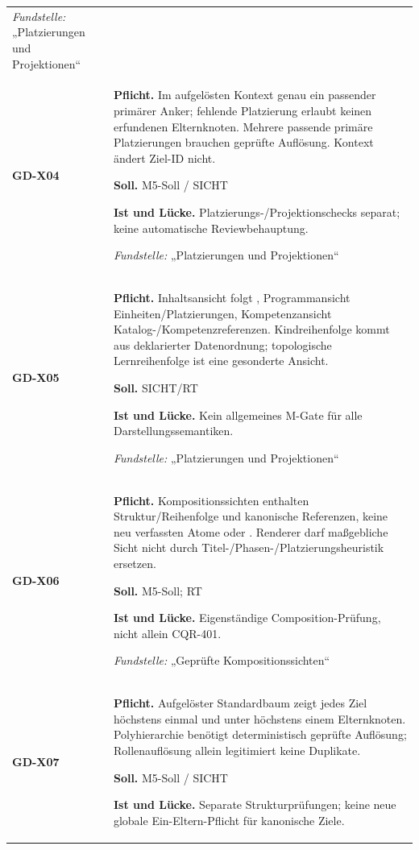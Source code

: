 \begin{longtable}{@{}P{20mm}P{128mm}@{}}
\emph{Fundstelle:} „Platzierungen und Projektionen“\\\addlinespace[5pt]
\label{rule:GD-X04}\textbf{GD-X04} &
\textbf{Pflicht.} Im aufgelösten Kontext genau ein passender primärer Anker; fehlende Platzierung erlaubt keinen erfundenen Elternknoten. Mehrere passende primäre Platzierungen brauchen geprüfte Auflösung. Kontext ändert Ziel-ID nicht.\par\smallskip
\textbf{Soll.} M5-Soll / SICHT\par\smallskip
\textbf{Ist und Lücke.} Platzierungs-/Projektionschecks separat; keine automatische Reviewbehauptung.\par\smallskip
\emph{Fundstelle:} „Platzierungen und Projektionen“\\\addlinespace[5pt]
\label{rule:GD-X05}\textbf{GD-X05} &
\textbf{Pflicht.} Inhaltsansicht folgt , Programmansicht Einheiten/Platzierungen, Kompetenzansicht Katalog-/Kompetenzreferenzen. Kindreihenfolge kommt aus deklarierter Datenordnung; topologische Lernreihenfolge ist eine gesonderte Ansicht.\par\smallskip
\textbf{Soll.} SICHT/RT\par\smallskip
\textbf{Ist und Lücke.} Kein allgemeines M-Gate für alle Darstellungssemantiken.\par\smallskip
\emph{Fundstelle:} „Platzierungen und Projektionen“\\\addlinespace[5pt]
\label{rule:GD-X06}\textbf{GD-X06} &
\textbf{Pflicht.} Kompositionssichten enthalten Struktur/Reihenfolge und kanonische Referenzen, keine neu verfassten Atome oder . Renderer darf maßgebliche Sicht nicht durch Titel-/Phasen-/Platzierungsheuristik ersetzen.\par\smallskip
\textbf{Soll.} M5-Soll; RT\par\smallskip
\textbf{Ist und Lücke.} Eigenständige Composition-Prüfung, nicht allein CQR-401.\par\smallskip
\emph{Fundstelle:} „Geprüfte Kompositionssichten“\\\addlinespace[5pt]
\label{rule:GD-X07}\textbf{GD-X07} &
\textbf{Pflicht.} Aufgelöster Standardbaum zeigt jedes Ziel höchstens einmal und unter höchstens einem Elternknoten. Polyhierarchie benötigt deterministisch geprüfte Auflösung; Rollenauflösung allein legitimiert keine Duplikate.\par\smallskip
\textbf{Soll.} M5-Soll / SICHT\par\smallskip
\textbf{Ist und Lücke.} Separate Strukturprüfungen; keine neue globale Ein-Eltern-Pflicht für kanonische Ziele.\par\smallskip

\end{longtable}
